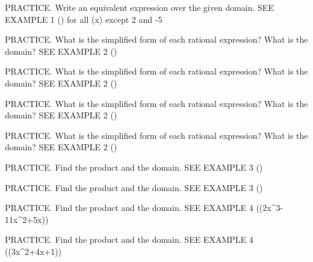 \documentclass{article}
\newenvironment{practice}[2]{}{}        %
\newcommand{\answer}[1]{}               %
\begin{document}
\begin{practice}{21}{1}
PRACTICE. Write an equivalent expression over the given domain. SEE EXAMPLE 1
() for all (x) except 2 and -5
\answer{(\frac{3x^2+15x}{x^2+3x-10})}
\end{practice}
\begin{practice}{22}{1}
PRACTICE. What is the simplified form of each rational expression? What is the domain? SEE EXAMPLE 2
()
\answer{(\frac{y-8}{y}) for all (y) except 0 and -3.}
\end{practice}
\begin{practice}{23}{1}
PRACTICE. What is the simplified form of each rational expression? What is the domain? SEE EXAMPLE 2
()
\answer{(\frac{b(b+3)}{12(b+4)}) for all real numbers except (a=0), (b=-4) and 3.}
\end{practice}
\begin{practice}{24}{1}
PRACTICE. What is the simplified form of each rational expression? What is the domain? SEE EXAMPLE 2
()
\answer{(\frac{x+5}{x-4}), (x\neq-3,4).}
\end{practice}
\begin{practice}{25}{1}
PRACTICE. What is the simplified form of each rational expression? What is the domain? SEE EXAMPLE 2
()
\answer{(\frac{(x+10)(x-1)}{(x-10)(x+1)}), (x\neq-1,0,10).}
\end{practice}
\begin{practice}{26}{1}
PRACTICE. Find the product and the domain. SEE EXAMPLE 3
(\cdot{})
\answer{(\frac{x+4}{x+1}) for all (x) except -3, -2, and -1.}
\end{practice}
\begin{practice}{27}{1}
PRACTICE. Find the product and the domain. SEE EXAMPLE 3
(\cdot{})
\answer{(\frac{3(x-y)}{x+y}) for all real numbers except (x=y) or (x=-y).}
\end{practice}
\begin{practice}{28}{1}
PRACTICE. Find the product and the domain. SEE EXAMPLE 4
(\cdot(2x^3-11x^2+5x))
\answer{(2x-1) for all (x) except 0, -5, and 5.}
\end{practice}
\begin{practice}{29}{1}
PRACTICE. Find the product and the domain. SEE EXAMPLE 4
(\cdot(3x^2+4x+1))
\answer{(\frac{2x(3x+1)}{x-1}) for all (x) except -1, 1, and 5.}
\end{practice}
\end{document}
